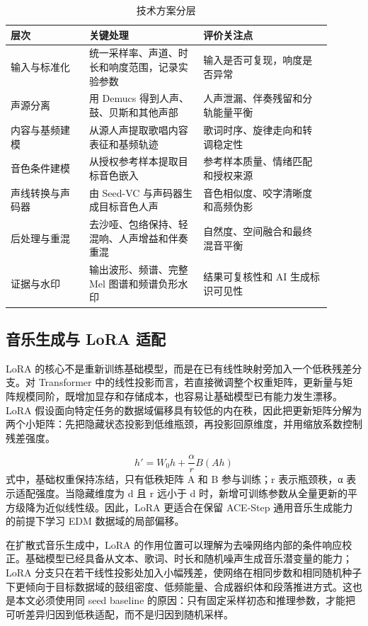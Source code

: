 \documentclass[UTF8,a4paper,zihao=-4,fontset=none]{ctexart}
\begin{document}
\begin{table}[H]
\centering
\caption{技术方案分层}
\small
\begin{tabular}{p{0.22\linewidth}p{0.32\linewidth}p{0.36\linewidth}}
\toprule
层次 & 关键处理 & 评价关注点 \\
\midrule
输入与标准化 & 统一采样率、声道、时长和响度范围，记录实验参数 & 输入是否可复现，响度是否异常 \\
声源分离 & 用 Demucs 得到人声、鼓、贝斯和其他声部 & 人声泄漏、伴奏残留和分轨能量平衡 \\
内容与基频建模 & 从源人声提取歌唱内容表征和基频轨迹 & 歌词时序、旋律走向和转调稳定性 \\
音色条件建模 & 从授权参考样本提取目标音色嵌入 & 参考样本质量、情绪匹配和授权来源 \\
声线转换与声码器 & 由 Seed-VC 与声码器生成目标音色人声 & 音色相似度、咬字清晰度和高频伪影 \\
后处理与重混 & 去沙哑、包络保持、轻混响、人声增益和伴奏重混 & 自然度、空间融合和最终混音平衡 \\
证据与水印 & 输出波形、频谱、完整 Mel 图谱和频谱负形水印 & 结果可复核性和 AI 生成标识可见性 \\
\bottomrule
\end{tabular}
\end{table}
\subsection{音乐生成与 LoRA 适配}
LoRA 的核心不是重新训练基础模型，而是在已有线性映射旁加入一个低秩残差分支。对 Transformer 中的线性投影而言，若直接微调整个权重矩阵，更新量与矩阵规模同阶，既增加显存和存储成本，也容易让基础模型已有能力发生漂移。LoRA 假设面向特定任务的数据域偏移具有较低的内在秩，因此把更新矩阵分解为两个小矩阵：先把隐藏状态投影到低维瓶颈，再投影回原维度，并用缩放系数控制残差强度。

\begin{equation}
h'=W_0h+\frac{\alpha}{r}B(Ah)
\end{equation}
式中，基础权重保持冻结，只有低秩矩阵 A 和 B 参与训练；r 表示瓶颈秩，α 表示适配强度。当隐藏维度为 d 且 r 远小于 d 时，新增可训练参数从全量更新的平方级降为近似线性级。因此，LoRA 更适合在保留 ACE-Step 通用音乐生成能力的前提下学习 EDM 数据域的局部偏移。

在扩散式音乐生成中，LoRA 的作用位置可以理解为去噪网络内部的条件响应校正。基础模型已经具备从文本、歌词、时长和随机噪声生成音乐潜变量的能力；LoRA 分支只在若干线性投影处加入小幅残差，使网络在相同步数和相同随机种子下更倾向于目标数据域的鼓组密度、低频能量、合成器织体和段落推进方式。这也是本文必须使用同 seed baseline 的原因：只有固定采样初态和推理参数，才能把可听差异归因到低秩适配，而不是归因到随机采样。
\end{document}

